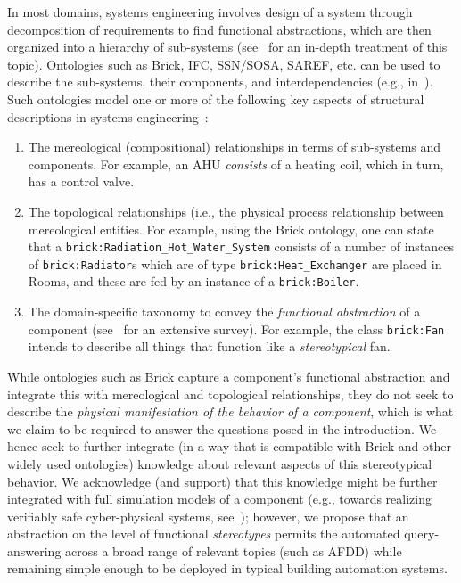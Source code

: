\documentclass[sigconf]{acmart}
\begin{document}
In most domains, systems engineering involves design of a system through decomposition of requirements to find functional abstractions, which are then organized into a hierarchy of sub-systems (see~\cite{sd_nielsen2015systems} for an in-depth treatment of this topic).
Ontologies such as Brick, IFC, SSN/SOSA, SAREF, etc. can be used to describe the sub-systems, their components, and interdependencies (e.g., in~\cite{sd_pauen2021tubes}).
Such ontologies model one or more of the following key aspects of structural descriptions in systems engineering~\cite{sd_van2013ontology,pp_borst1995physsys}: 
\begin{enumerate}
    \item The mereological (compositional) relationships in terms of sub-systems and components. For example, an AHU \textit{consists} of a heating coil, which in turn, has a control valve.
    \item The topological relationships (i.e., the physical process relationship between mereological entities. For example, using the Brick ontology, one can state that a \texttt{brick:Ra\-di\-a\-tion\_Hot\_Water\_System} consists of a number of instances of \texttt{brick:Ra\-di\-a\-tor}s which are of type \texttt{brick:Heat\_Ex\-chan\-ger} are placed in Rooms, and these are fed by an instance of a \texttt{brick:Boiler}.
    \item The domain-specific taxonomy to convey the \textit{functional abstraction} of a component (see~\cite{sd_yang2019ontology} for an extensive survey). For example, the class \texttt{brick:Fan} intends to describe all things that function like a \textit{stereotypical} fan. 
\end{enumerate}

While ontologies such as Brick capture a component's functional abstraction and integrate this with mereological and topological relationships, they do not seek to describe the \emph{physical manifestation of the behavior of a component}, which is what we claim to be required to answer the questions posed in the introduction. We hence seek to further integrate (in a way that is compatible with Brick and other widely used ontologies) knowledge about relevant aspects of this stereotypical behavior. We acknowledge (and support) that this knowledge might be further integrated with full simulation models of a component (e.g., towards realizing verifiably safe cyber-physical systems, see~\cite{pp_hybrid_tds_garcia2019hyplc}); however, we propose that an abstraction on the level of functional \emph{stereotypes} permits the automated query-answering across a broad range of relevant topics (such as AFDD) while remaining simple enough to be deployed in typical building automation systems.
\end{document}
